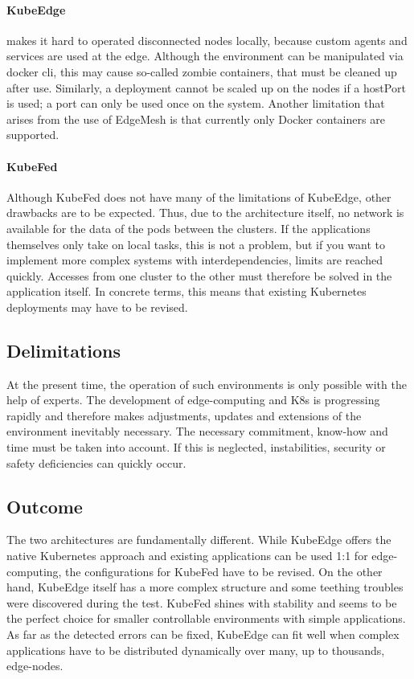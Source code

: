 \documentclass[MIC,Master,english]{twbook}%
\begin{document}
\paragraph{KubeEdge} makes it hard to operated disconnected nodes locally, because custom agents and services are used at the edge. Although the environment can be manipulated via docker cli, this may cause so-called zombie containers, that must be cleaned up after use. Similarly, a deployment cannot be scaled up on the nodes if a hostPort is used; a port can only be used once on the system. Another limitation that arises from the use of EdgeMesh is that currently only Docker containers are supported.

\paragraph{KubeFed} Although KubeFed does not have many of the limitations of KubeEdge, other drawbacks are to be expected. Thus, due to the architecture itself, no network is available for the data of the pods between the clusters. If the applications themselves only take on local tasks, this is not a problem, but if you want to implement more complex systems with interdependencies, limits are reached quickly. Accesses from one cluster to the other must therefore be solved in the application itself. In concrete terms, this means that existing Kubernetes deployments may have to be revised.

\subsection{Delimitations} At the present time, the operation of such environments is only possible with the help of experts. The development of edge-computing and \ac{K8s} is progressing rapidly and therefore makes adjustments, updates and extensions of the environment inevitably necessary. The necessary commitment, know-how and time must be taken into account. If this is neglected, instabilities, security or safety deficiencies can quickly occur. 

\subsection{Outcome} The two architectures are fundamentally different. While KubeEdge offers the native Kubernetes approach and existing applications can be used 1:1 for edge-computing, the configurations for KubeFed have to be revised. On the other hand, KubeEdge itself has a more complex structure and some teething troubles were discovered during the test. KubeFed shines with stability and seems to be the perfect choice for smaller controllable environments with simple applications. As far as the detected errors can be fixed, KubeEdge can fit well when complex applications have to be distributed dynamically over many, up to thousands, edge-nodes.
\end{document}
